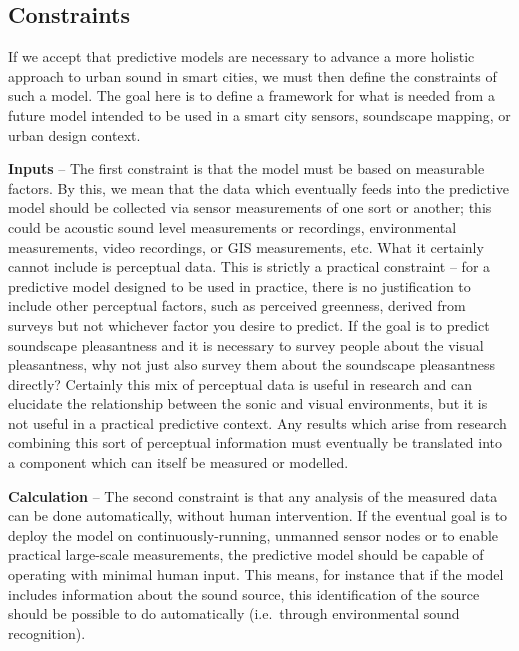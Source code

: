 \documentclass[
  authoryear,
  preprint,
  1p]{elsarticle}
\begin{document}
\hypertarget{constraints}{%
\subsection{Constraints}\label{constraints}}

If we accept that predictive models are necessary to advance a more
holistic approach to urban sound in smart cities, we must then define
the constraints of such a model. The goal here is to define a framework
for what is needed from a future model intended to be used in a smart
city sensors, soundscape mapping, or urban design context.

\textbf{Inputs} -- The first constraint is that the model must be based
on measurable factors. By this, we mean that the data which eventually
feeds into the predictive model should be collected via sensor
measurements of one sort or another; this could be acoustic sound level
measurements or recordings, environmental measurements, video
recordings, or GIS measurements, etc. What it certainly cannot include
is perceptual data. This is strictly a practical constraint -- for a
predictive model designed to be used in practice, there is no
justification to include other perceptual factors, such as perceived
greenness, derived from surveys but not whichever factor you desire to
predict. If the goal is to predict soundscape pleasantness and it is
necessary to survey people about the visual pleasantness, why not just
also survey them about the soundscape pleasantness directly? Certainly
this mix of perceptual data is useful in research and can elucidate the
relationship between the sonic and visual environments, but it is not
useful in a practical predictive context. Any results which arise from
research combining this sort of perceptual information must eventually
be translated into a component which can itself be measured or modelled.

\textbf{Calculation} -- The second constraint is that any analysis of
the measured data can be done automatically, without human intervention.
If the eventual goal is to deploy the model on continuously-running,
unmanned sensor nodes or to enable practical large-scale measurements,
the predictive model should be capable of operating with minimal human
input. This means, for instance that if the model includes information
about the sound source, this identification of the source should be
possible to do automatically (i.e.~through environmental sound
recognition).
\end{document}
